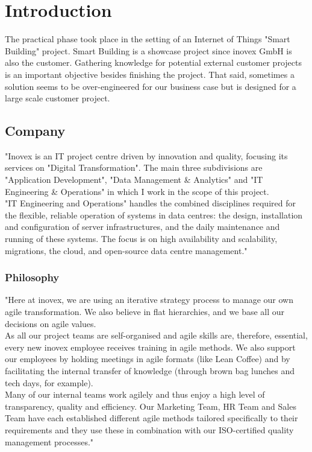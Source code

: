 \section{Introduction}
The practical phase took place in the setting of an Internet of Things "Smart Building" project. Smart Building is a showcase project since inovex GmbH is also the customer. Gathering knowledge for potential external customer projects is an important objective besides finishing the project. That said, sometimes a solution seems to be over-engineered for our business case but is designed for a large scale customer project.

\subsection{Company}
"Inovex is an IT project centre driven by innovation and quality, focusing its services on "Digital Transformation". The main three subdivisions are "Application Development", "Data Management \& Analytics" and "IT Engineering \& Operations" in which I work in the scope of this project.\\
"IT Engineering and Operations" handles the combined disciplines required for the flexible, reliable operation of systems in data centres: the design, installation and configuration of server infrastructures, and the daily maintenance and running of these systems. The focus is on high availability and scalability, migrations, the cloud, and open-source data centre management."\cite{inovex}

\subsubsection{Philosophy}
"Here at inovex, we are using an iterative strategy process to manage our own agile transformation. We also believe in flat hierarchies, and we base all our decisions on agile values.\\
As all our project teams are self-organised and agile skills are, therefore, essential, every new inovex employee receives training in agile methods. We also support our employees by holding meetings in agile formats (like Lean Coffee) and by facilitating the internal transfer of knowledge (through brown bag lunches and tech days, for example).\\
Many of our internal teams work agilely and thus enjoy a high level of transparency, quality and efficiency. Our Marketing Team, HR Team and Sales Team have each established different agile methods tailored specifically to their requirements and they use these in combination with our ISO-certified quality management processes."\cite{inovex}
\newpage

